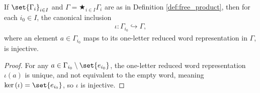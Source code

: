 \begin{corollary}
  If $\set{\Gamma_i}_{i\in I}$ and $\Gamma = \bigstar_{i\in I}\Gamma_i$ are as in Definition \ref{def:free_product}, then for each $i_0\in I$, the canonical inclusion
  \begin{align*}
    \iota\colon \Gamma_{i_0}\hookrightarrow \Gamma,
  \end{align*}
  where an element $a\in \Gamma_{i_0}$ maps to its one-letter reduced word representation in $\Gamma$, is injective.
\end{corollary}
\begin{proof}
  For any $a\in \Gamma_{i_0}\setminus \set{e_{i_0}}$, the one-letter reduced word representation $\iota(a)$ is unique, and not equivalent to the empty word, meaning $\ker\left(\iota\right) = \set{e_{i_0}}$, so $\iota$ is injective.
\end{proof}

